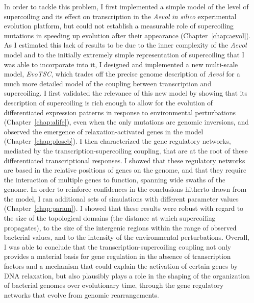 In order to tackle this problem, I first implemented a simple model of the level of supercoiling and its effect on transcription in the \emph{Aevol} \emph{in silico} experimental evolution platform, but could not establish a measurable role of supercoiling mutations in speeding up evolution after their appearance (Chapter~\ref{chap:aevol}).
As I estimated this lack of results to be due to the inner complexity of the \emph{Aevol} model and to the initially extremely simple representation of supercoiling that I was able to incorporate into it, I designed and implemented a new multi-scale model, \emph{EvoTSC}, which trades off the precise genome description of \emph{Aevol} for a much more detailed model of the coupling between transcription and supercoiling.
I first validated the relevance of this new model by showing that its description of supercoiling is rich enough to allow for the evolution of differentiated expression patterns in response to environmental perturbations (Chapter~\ref{chap:alife}), even when the only mutations are genomic inversions, and observed the emergence of relaxation-activated genes in the model (Chapter~\ref{chap:ploscb}).
I then characterized the gene regulatory networks, mediated by the  transcription-supercoiling coupling, that are at the root of these differentiated transcriptional responses.
I showed that these regulatory networks are based in the relative positions of genes on the genome, and that they require the interaction of multiple genes to function, spanning wide swaths of the genome.
In order to reinforce confidences in the conclusions hitherto drawn from the model, I ran additional sets of simulations with different parameter values (Chapter~\ref{chap:param}).
I showed that these results were robust with regard to the size of the topological domains (the distance at which supercoiling propagates), to the size of the intergenic regions within the range of observed bacterial values, and to the intensity of the environmental perturbations.
Overall, I was able to conclude that the transcription-supercoiling coupling not only provides a material basis for gene regulation in the absence of transcription factors and a mechanism that could explain the activation of certain genes by DNA relaxation, but also plausibly plays a role in the shaping of the organization of bacterial genomes over evolutionary time, through the gene regulatory networks that evolve from genomic rearrangements.


